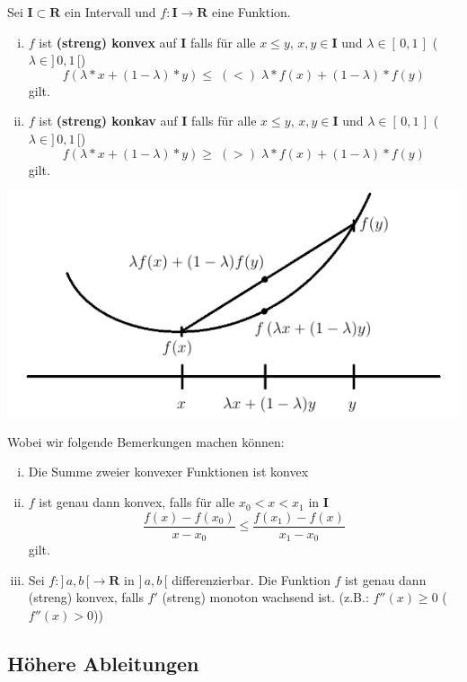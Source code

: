 \documentclass[8pt]{article}
\begin{document}
\begin{multicols*}{3}
Sei $\mathbf{I} \subset \mathbf{R}$ ein Intervall und $f:\mathbf{I} \rightarrow \mathbf{R}$ eine Funktion.
\begin{enumerate}[(i)]
  \item $f$ ist \textbf{(streng) konvex} auf $\mathbf{I}$ falls für alle $x \leq y$, $x, y \in \mathbf{I}$
  und $\lambda \in [\, 0, 1 \,]$ ($\lambda \in ]\, 0, 1 \,[$)
  $$f(\lambda * x + (1 - \lambda) * y) \leq \;(<)\; \lambda * f(x) + (1 - \lambda) * f(y)$$ gilt.
  \item $f$ ist \textbf{(streng) konkav} auf $\mathbf{I}$ falls für alle $x \leq y$, $x, y \in \mathbf{I}$
  und $\lambda \in [\, 0, 1 \,]$ ($\lambda \in ]\, 0, 1 \,[$)
  $$f(\lambda * x + (1 - \lambda) * y) \geq \;(>)\; \lambda * f(x) + (1 - \lambda) * f(y)$$ gilt.
\end{enumerate}
\begin{center}
  \includegraphics[scale=0.4]{konvex.png}
\end{center}
Wobei wir folgende Bemerkungen machen können:
\begin{enumerate}[(i)]
  \item Die Summe zweier konvexer Funktionen ist konvex
  \item $f$ ist genau dann konvex, falls für alle $x_0 < x < x_1$ in $\mathbf{I}$
  $$
    \frac{f(x) - f(x_0)}{x - x_0} \leq \frac{f(x_1) - f(x)}{x_1 - x_0}
  $$
  gilt.
  \item Sei $f: ]\,a, b\,[ \rightarrow \mathbf{R}$ in $]\,a, b\,[$ differenzierbar. Die Funktion
  $f$ ist genau dann (streng) konvex, falls $f'$ (streng) monoton wachsend ist. (z.B.: $f''(x) \geq 0$ ($f''(x) > 0$))
\end{enumerate}

\subsection{Höhere Ableitungen}


\end{multicols*}
\end{document}

